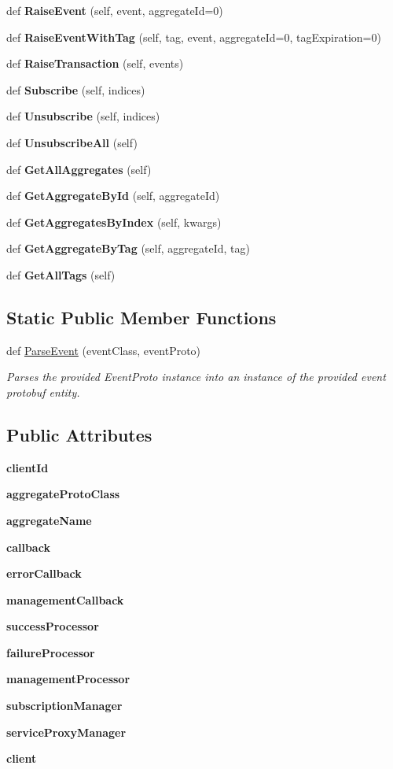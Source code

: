 \begin{DoxyCompactItemize}
def {\bfseries Raise\+Event} (self, event, aggregate\+Id=0)
\item 
def {\bfseries Raise\+Event\+With\+Tag} (self, tag, event, aggregate\+Id=0, tag\+Expiration=0)
\item 
def {\bfseries Raise\+Transaction} (self, events)
\item 
def {\bfseries Subscribe} (self, indices)
\item 
def {\bfseries Unsubscribe} (self, indices)
\item 
def {\bfseries Unsubscribe\+All} (self)
\item 
def {\bfseries Get\+All\+Aggregates} (self)
\item 
def {\bfseries Get\+Aggregate\+By\+Id} (self, aggregate\+Id)
\item 
def {\bfseries Get\+Aggregates\+By\+Index} (self, kwargs)
\item 
def {\bfseries Get\+Aggregate\+By\+Tag} (self, aggregate\+Id, tag)
\item 
def {\bfseries Get\+All\+Tags} (self)
\end{DoxyCompactItemize}
\subsection*{Static Public Member Functions}
\begin{DoxyCompactItemize}
\item 
def \hyperlink{group__Chronos_gafdce0107a1a368f4f4f7e7c9b084fc0c}{Parse\+Event} (event\+Class, event\+Proto)
\begin{DoxyCompactList}\small\item\em Parses the provided Event\+Proto instance into an instance of the provided event protobuf entity. \end{DoxyCompactList}\end{DoxyCompactItemize}
\subsection*{Public Attributes}
\begin{DoxyCompactItemize}
\item 
{\bfseries client\+Id}
\item 
{\bfseries aggregate\+Proto\+Class}
\item 
{\bfseries aggregate\+Name}
\item 
{\bfseries callback}
\item 
{\bfseries error\+Callback}
\item 
{\bfseries management\+Callback}
\item 
{\bfseries success\+Processor}
\item 
{\bfseries failure\+Processor}
\item 
{\bfseries management\+Processor}
\item 
{\bfseries subscription\+Manager}
\item 
{\bfseries service\+Proxy\+Manager}
\item 
{\bfseries client}
\end{DoxyCompactItemize}
